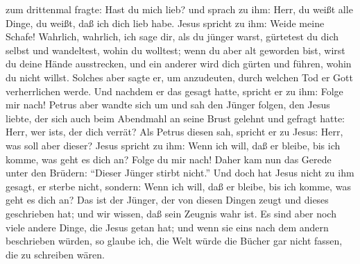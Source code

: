 zum drittenmal fragte: Hast du mich lieb? und sprach zu ihm: Herr, du
weißt alle Dinge, du weißt, daß ich dich lieb habe. Jesus spricht zu
ihm: Weide meine Schafe!  Wahrlich, wahrlich, ich sage
dir, als du jünger warst, gürtetest du dich selbst und wandeltest, wohin
du wolltest; wenn du aber alt geworden bist, wirst du deine Hände
ausstrecken, und ein anderer wird dich gürten und führen, wohin du nicht
willst.  Solches aber sagte er, um anzudeuten, durch
welchen Tod er Gott verherrlichen werde. Und nachdem er das gesagt
hatte, spricht er zu ihm: Folge mir nach!  Petrus aber
wandte sich um und sah den Jünger folgen, den Jesus liebte, der sich
auch beim Abendmahl an seine Brust gelehnt und gefragt hatte: Herr, wer
ist\textquotesingle s, der dich verrät?  Als Petrus
diesen sah, spricht er zu Jesus: Herr, was soll aber dieser?
 Jesus spricht zu ihm: Wenn ich will, daß er bleibe, bis
ich komme, was geht es dich an? Folge du mir nach!  Daher
kam nun das Gerede unter den Brüdern: ``Dieser Jünger stirbt nicht.''
Und doch hat Jesus nicht zu ihm gesagt, er sterbe nicht, sondern: Wenn
ich will, daß er bleibe, bis ich komme, was geht es dich an?
 Das ist der Jünger, der von diesen Dingen zeugt und
dieses geschrieben hat; und wir wissen, daß sein Zeugnis wahr ist.
 Es sind aber noch viele andere Dinge, die Jesus getan
hat; und wenn sie eins nach dem andern beschrieben würden, so glaube
ich, die Welt würde die Bücher gar nicht fassen, die zu schreiben wären.

